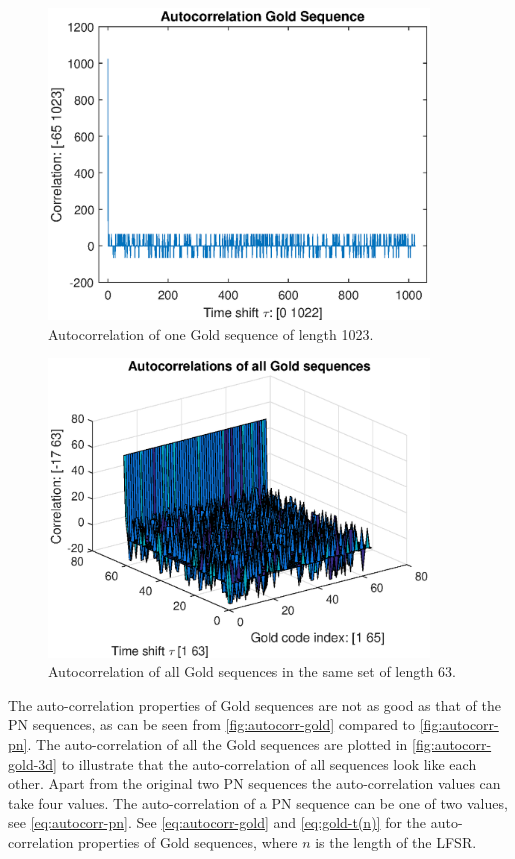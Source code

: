 \begin{figure}[tbp]
	\centering
	\includegraphics[width=0.9\textwidth]{chapters/cdma-chapters/codes/autocorr-gold.eps}
	\caption{Autocorrelation of one Gold sequence of length 1023.}
	\label{fig:autocorr-gold}
\end{figure}


\begin{figure}[tbp]
	\centering
	\includegraphics[width=0.9\textwidth]{chapters/cdma-chapters/codes/autocorr-gold-3d.eps}
	\caption{Autocorrelation of all Gold sequences in the same set of length 63.}
	\label{fig:autocorr-gold-3d}
\end{figure}




The auto-correlation properties of Gold sequences are not as good as that of the PN sequences, as can be seen from \autoref{fig:autocorr-gold} compared to \autoref{fig:autocorr-pn}.
The auto-correlation of all the Gold sequences are plotted in \autoref{fig:autocorr-gold-3d} to illustrate that the auto-correlation of all sequences look like each other.
Apart from the original two PN sequences the auto-correlation values can take four values.
The auto-correlation of a PN sequence can be one of two values, see \autoref{eq:autocorr-pn}.
See \autoref{eq:autocorr-gold} and \autoref{eq:gold-t(n)} for the auto-correlation properties of Gold sequences, where $n$ is the length of the LFSR.

